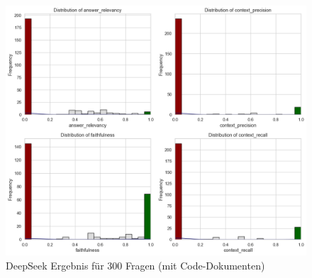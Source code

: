 \begin{figure}[!ht]
    \centering
    \includegraphics[width=1\textwidth]{images/3_3_code_invest_D_D_colored}
    \caption[DeepSeek Metriken für 300 Fragen]{DeepSeek Ergebnis für 300 Fragen (mit Code-Dokumenten)}
    \label{fig:deepseek_code}
\end{figure}

